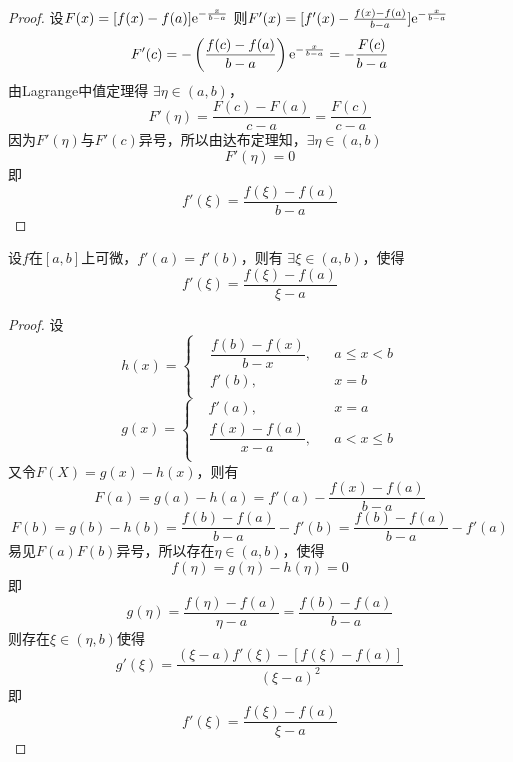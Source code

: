 \begin{proof}
    
    设\(F(x) = [f(x) - f(a)]\mathrm{e}^{-\frac{x}{b - a}}\)
    则\(F'(x) = [f'(x) - \frac{f(x) - f(a)}{b - a}]\mathrm{e}^{-\frac{x}{b - a}}\)
    \[F'(c) = -\left( \dfrac{f(c) - f(a)}{b - a} \right)\mathrm{e}^{-\frac{x}{b - a}} = -\dfrac{F(c)}{b - a}\]
    由\textup{Lagrange}中值定理得
    \(\exists \eta \in (a, b)\)，
    \[F'(\eta) = \dfrac{F(c) - F(a)}{c - a} = \dfrac{F(c)}{c - a}\]
    因为\(F'(\eta)\)与\(F'(c)\)异号，所以由达布定理知，\(\exists \eta \in (a, b)\)
    \[F'(\eta) = 0\]
    即
    \[f'(\xi) = \dfrac{f(\xi) - f(a)}{b - a}\]

\end{proof}

\begin{theorem}[Flett中值定理]
    
    设\(f\)在\([a, b]\)上可微，\(f'(a) = f'(b)\)，则有
    \(\exists \xi \in (a, b)\)，使得
    \[f'(\xi) = \dfrac{f(\xi) - f(a)}{\xi - a}\]

\end{theorem}

\begin{proof}
    
    设\[
        h(x) = \left\{
        \begin{aligned}
            & \dfrac{f(b) - f(x)}{b - x}, &&a \leq x < b \\
            &f'(b), &&x = b \\
        \end{aligned}
    \right.
    \]
    \[
        g(x) = \left\{
        \begin{aligned}
            &f'(a), &&x = a \\
            & \dfrac{f(x) - f(a)}{x - a}, &&a < x \leq b \\
        \end{aligned}
    \right.
    \]
    又令\(F(X) = g(x) - h(x)\)，则有
    \[F(a) = g(a) - h(a) = f'(a) - \dfrac{f(x) - f(a)}{b - a}\]
    \[F(b) = g(b) - h(b) = \dfrac{f(b) - f(a)}{b - a}  - f'(b) = \dfrac{f(b) - f(a)}{b - a} - f'(a)\]
    易见\(F(a)F(b)\)异号，所以存在\(\eta \in (a, b)\)，使得
    \[ f(\eta) = g(\eta) - h(\eta) = 0\]
    即
    \[g(\eta) = \dfrac{f(\eta) - f(a)}{\eta - a } =  \dfrac{f(b) - f(a)}{b - a}\]
    则存在\(\xi \in (\eta, b)\)使得
    \[g'(\xi) = \dfrac{(\xi - a)f'(\xi) - [f(\xi) - f(a)]}{(\xi - a)^2}\]
    即
    \[f'(\xi) = \dfrac{f(\xi) - f(a)}{\xi - a}\]

\end{proof}


